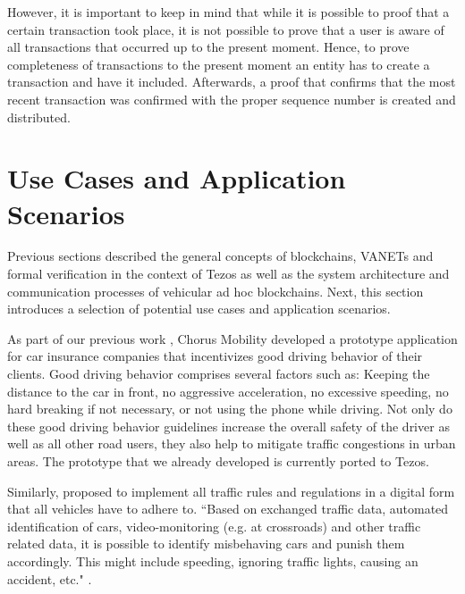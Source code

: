 \documentclass{llncs}
\begin{document}
{			However, it is important to keep in mind that while it is possible to proof that a certain transaction took place, it is not possible to prove that a user is aware of all transactions that occurred up to the present moment. Hence, to prove completeness of transactions to the present moment an entity has to create a transaction and have it included. Afterwards, a proof that confirms that the most recent transaction was confirmed with the proper sequence number is created and distributed. 

			

	
	\section{Use Cases and Application Scenarios}
		\label{s:section-5}	
	
		
		Previous sections described the general concepts of blockchains, VANETs and formal verification in the context of Tezos as well as the system architecture and communication processes of vehicular ad hoc blockchains. Next, this section introduces a selection of potential use cases and application scenarios.
		
		As part of our previous work \cite{chorusWhitepaper}, Chorus Mobility developed a prototype application for car insurance companies that incentivizes good driving behavior of their clients. Good driving behavior comprises several factors such as: Keeping the distance to the car in front, no aggressive acceleration, no excessive speeding, no hard breaking if not necessary, or not using the phone while driving. Not only do these good driving behavior guidelines increase the overall safety of the driver as well as all other road users, they also help to mitigate traffic congestions in urban areas. The prototype that we already developed is currently ported to Tezos.
		
		Similarly, \cite{leiding2016self} proposed to implement all traffic rules and regulations in a digital form that all vehicles have to adhere to. ``Based on exchanged traffic data, automated identification of cars, video-monitoring (e.g. at crossroads) and other traffic related data, it is possible to identify misbehaving cars and punish them accordingly. This might include speeding, ignoring traffic lights, causing an accident, etc." \cite{leiding2016self}.
		
}
\end{document}

